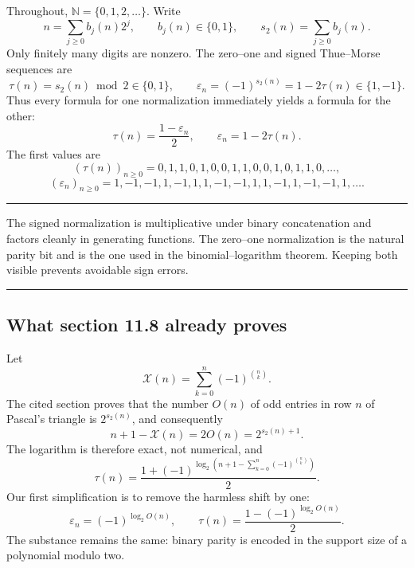 \documentclass[11pt,oneside]{article}
\theoremstyle{definition}
\theoremstyle{remark}
\newcommand{\N}{\mathbb N}
\newcommand{\swt}{s_2}
\newcommand{\eps}{\varepsilon}
\newcommand{\1}{\mathbf 1}
\newenvironment{boxedremark}{%
  \par\smallskip\noindent\begin{center}\begin{minipage}{0.94\textwidth}%
  \color{black}\hrule\vspace{0.6em}\small
}{%
  \vspace{0.6em}\hrule\end{minipage}\end{center}\smallskip
}
\begin{document}
Throughout, \(\N=\{0,1,2,\ldots\}\).  Write
\[
 n=\sum_{j\ge 0} b_j(n)2^j,
 \qquad b_j(n)\in\{0,1\},
 \qquad \swt(n)=\sum_{j\ge0}b_j(n).
\]
Only finitely many digits are nonzero.  The zero--one and signed Thue--Morse sequences are
\begin{equation}
 \tau(n)=\swt(n)\bmod2\in\{0,1\},
 \qquad
 \eps_n=(-1)^{\swt(n)}=1-2\tau(n)\in\{1,-1\}.
 \label{p3:eq:normalizations}
\end{equation}
Thus every formula for one normalization immediately yields a formula for the other:
\begin{equation}
 \tau(n)=\frac{1-\eps_n}{2},
 \qquad
 \eps_n=1-2\tau(n).
 \label{p3:eq:conversion}
\end{equation}
The first values are
\[
 (\tau(n))_{n\ge0}=0,1,1,0,1,0,0,1,1,0,0,1,0,1,1,0,\ldots,
\]
\[
 (\eps_n)_{n\ge0}=1,-1,-1,1,-1,1,1,-1,-1,1,1,-1,1,-1,-1,1,\ldots.
\]

\begin{boxedremark}
The signed normalization is multiplicative under binary concatenation and factors cleanly in
generating functions.  The zero--one normalization is the natural parity bit and is the one
used in the binomial--logarithm theorem.  Keeping both visible prevents avoidable sign errors.
\end{boxedremark}

\subsection{What section 11.8 already proves}

Let
\begin{equation}
 \mathcal X(n)=\sum_{k=0}^{n}(-1)^{\binom nk}.
 \label{p3:eq:source-X}
\end{equation}
The cited section proves that the number \(O(n)\) of odd entries in row \(n\) of Pascal's
triangle is \(2^{\swt(n)}\), and consequently
\begin{equation}
 n+1-\mathcal X(n)=2O(n)=2^{\swt(n)+1}.
 \label{p3:eq:source-exact-power}
\end{equation}
The logarithm is therefore exact, not numerical, and
\begin{equation}
 \tau(n)
 =\frac{1+(-1)^{\log_2\!\left(n+1-\sum_{k=0}^{n}(-1)^{\binom nk}\right)}}{2}.
 \label{p3:eq:source-formula}
\end{equation}
Our first simplification is to remove the harmless shift by one:
\begin{equation}
 \boxed{
 \eps_n=(-1)^{\log_2 O(n)},
 \qquad
 \tau(n)=\frac{1-(-1)^{\log_2 O(n)}}2.}
 \label{p3:eq:pascal-count-direct}
\end{equation}
The substance remains the same: binary parity is encoded in the support size of a polynomial
modulo two.
\end{document}
